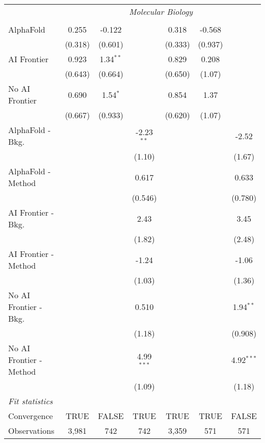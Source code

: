 \begin{tabular}{lcccccc}
 & \multicolumn{6}{c}{\textit{Molecular Biology}} \\ \\
   AlphaFold               & 0.255   & -0.122      &              & 0.318   & -0.568  &   \\   
                           & (0.318) & (0.601)     &              & (0.333) & (0.937) &   \\   
   AI Frontier             & 0.923   & 1.34$^{**}$ &              & 0.829   & 0.208   &   \\   
                           & (0.643) & (0.664)     &              & (0.650) & (1.07)  &   \\   
   No AI Frontier          & 0.690   & 1.54$^{*}$  &              & 0.854   & 1.37    &   \\   
                           & (0.667) & (0.933)     &              & (0.620) & (1.07)  &   \\   
   AlphaFold - Bkg.        &         &             & -2.23$^{**}$ &         &         & -2.52\\   
                           &         &             & (1.10)       &         &         & (1.67)\\   
   AlphaFold - Method      &         &             & 0.617        &         &         & 0.633\\   
                           &         &             & (0.546)      &         &         & (0.780)\\   
   AI Frontier - Bkg.      &         &             & 2.43         &         &         & 3.45\\   
                           &         &             & (1.82)       &         &         & (2.48)\\   
   AI Frontier - Method    &         &             & -1.24        &         &         & -1.06\\   
                           &         &             & (1.03)       &         &         & (1.36)\\   
   No AI Frontier - Bkg.   &         &             & 0.510        &         &         & 1.94$^{**}$\\   
                           &         &             & (1.18)       &         &         & (0.908)\\   
   No AI Frontier - Method &         &             & 4.99$^{***}$ &         &         & 4.92$^{***}$\\   
                           &         &             & (1.09)       &         &         & (1.18)\\   
   \midrule
   \emph{Fit statistics}\\
   Convergence             &TRUE     & FALSE       & TRUE         & TRUE    & TRUE    & FALSE\\  
   Observations            & 3,981   & 742         & 742          & 3,359   & 571     & 571\\  
   

\end{tabular}

